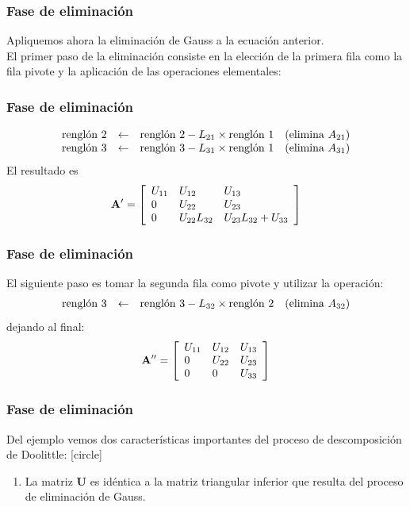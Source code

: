 \begin{frame}[fragile]
\frametitle{Fase de eliminación}
Apliquemos ahora la eliminación de Gauss a la ecuación anterior. 
\\
\bigskip
El primer paso de la eliminación consiste en la elección de la primera fila como la fila pivote y la aplicación de las operaciones elementales:
\end{frame}
\begin{frame}[fragile]
\frametitle{Fase de eliminación}
\fontsize{12}{12}\selectfont
\begin{align*}
\begin{array}{l l l l}
\text{renglón } 2 & \leftarrow & \text{renglón } 2 - L_{21} \times \text{renglón } 1 & (\text{elimina } A_{21}) \\
\text{renglón } 3 & \leftarrow & \text{renglón } 3 - L_{31} \times \text{renglón } 1 & (\text{elimina } A_{31})
\end{array}
\end{align*}
\fontsize{14}{14}\selectfont
El resultado es
\begin{align*}
\mathbf{A}^{\prime} =
\left[ \begin{array}{l l l}
U_{11} & U_{12} & U_{13} \\
0 & U_{22} & U_{23} \\
0 & U_{22}L_{32} & U_{23}L_{32}+U_{33}
\end{array} \right]
\end{align*}
\end{frame}
\begin{frame}
\frametitle{Fase de eliminación}
El siguiente paso es tomar la segunda fila como pivote y utilizar la operación:
\fontsize{12}{12}\selectfont
\begin{align*}
\begin{array}{l l l l}
\text{renglón } 3 & \leftarrow & \text{renglón } 3 - L_{32} \times \text{renglón } 2 & (\text{elimina } A_{32})
\end{array}
\end{align*}
\fontsize{14}{14}\selectfont
dejando al final:
\begin{align*}
\mathbf{A}^{\prime \prime} = \left[
\begin{array}{l l l}
U_{11} & U_{12} & U_{13} \\
0 & U_{22} & U_{23} \\
0 & 0 & U_{33}
\end{array} \right]
\end{align*}
\end{frame}
\begin{frame}
\frametitle{Fase de eliminación}
Del ejemplo vemos dos características importantes del proceso de descomposición de Doolittle:
[circle]
\begin{enumerate}[<+->]
\item La matriz $\mathbf{U}$ es idéntica a la matriz triangular inferior que resulta del proceso de eliminación de Gauss.
\seti
\end{enumerate}
\end{frame}
